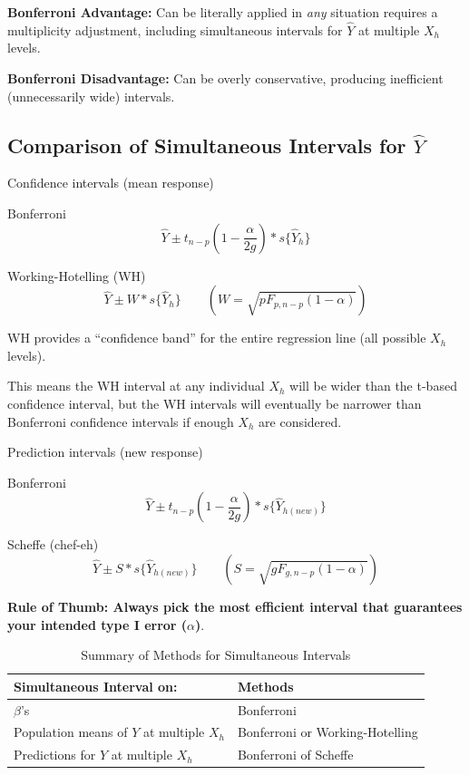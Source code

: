 \documentclass[12pt]{notes}
\begin{document}
\nspace
\bi
\item \textbf{Bonferroni Advantage:} Can be literally applied in \textit{any} situation requires a multiplicity adjustment, including simultaneous intervals for $\hat{Y}$ at multiple $X_h$ levels. 
\item \textbf{Bonferroni Disadvantage:} Can be overly conservative, producing inefficient (unnecessarily wide) intervals. 
\ei

\subsection*{Comparison of Simultaneous Intervals for $\hat{Y}$}
\bi
\item Confidence intervals (mean response)
\bi
\item Bonferroni
\[
\hat{Y} \pm t_{n-p}(1-\frac{\alpha}{2g})*s\{\hat{Y}_h\}
\]
\item Working-Hotelling (WH)
\[
\hat{Y} \pm W*s\{\hat{Y}_h\} \qquad \left(W = \sqrt{pF_{p, n-p}(1-\alpha)}\right)
\]

\begin{minipage}[l][2cm][c]{\textwidth}
\end{minipage}

\bi
\item WH provides a ``confidence band'' for the entire regression line (all possible $X_h$ levels). 
\item This means the WH interval at any individual $X_h$ will be wider than the t-based confidence interval, but the WH intervals will eventually be narrower than Bonferroni confidence intervals if enough $X_h$ are considered. 
\ei
\ei

\item Prediction intervals (new response)

\bi
\item Bonferroni
\[
\hat{Y} \pm t_{n-p}(1-\frac{\alpha}{2g})*s\{\hat{Y}_{h (new)}\}
\]
\item Scheffe (chef-eh)
\[
\hat{Y} \pm S*s\{\hat{Y}_{h (new)}\} \qquad \left(S = \sqrt{gF_{g, n-p}(1-\alpha)}\right)
\]
\ei
\ei

\textbf{Rule of Thumb: Always pick the most efficient interval that guarantees your intended type I error ($\alpha$)}. 

\nspace

\begin{table}[H]
\centering
\caption{Summary of Methods for Simultaneous Intervals}
\begin{tabular}{|l|l|}
\hline
\textbf{Simultaneous Interval on:} & \textbf{Methods} \\ \hline
$\beta$'s & Bonferroni \\ \hline
Population means of $Y$ at multiple $X_h$ & Bonferroni or Working-Hotelling \\ \hline
Predictions for $Y$ at multiple $X_h$ & Bonferroni of Scheffe \\ \hline
\end{tabular}
\end{table}
\end{document}
